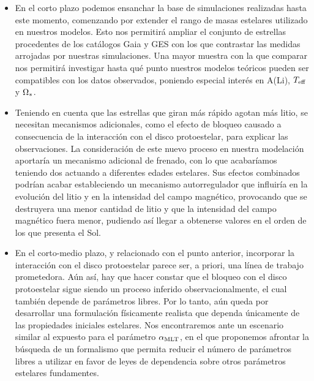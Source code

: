 \begin{itemize}
    \item En el corto plazo podemos ensanchar la base de simulaciones realizadas hasta este momento, comenzando por extender el rango de masas estelares utilizado en nuestros modelos. Esto nos permitirá ampliar el conjunto de estrellas procedentes de los catálogos Gaia y GES con los que contrastar las medidas arrojadas por nuestras simulaciones. Una mayor muestra con la que comparar nos permitirá investigar hasta qué punto nuestros modelos teóricos pueden ser compatibles con los datos observados, poniendo especial interés en A(Li), $T_{\mathrm{eff}}$ y $\Omega_*$.
    \item Teniendo en cuenta que las estrellas que giran más rápido agotan más litio, se necesitan mecanismos adicionales, como el efecto de bloqueo causado a consecuencia de la interacción con el disco protoestelar, para explicar las observaciones. La consideración de este nuevo proceso en nuestra modelación aportaría un mecanismo adicional de frenado, con lo que acabaríamos teniendo dos actuando a diferentes edades estelares. Sus efectos combinados podrían acabar estableciendo un mecanismo autorregulador que influiría en la evolución del litio y en la intensidad del campo magnético, provocando que se destruyera una menor cantidad de litio y que la intensidad del campo magnético fuera menor, pudiendo así llegar a obtenerse valores en el orden de los que presenta el Sol.
    \item En el corto-medio plazo, y relacionado con el punto anterior, incorporar la interacción con el disco protoestelar parece ser, a priori, una línea de trabajo prometedora. Aún así, hay que hacer constar que el bloqueo con el disco protoestelar sigue siendo un proceso inferido observacionalmente, el cual también depende de parámetros libres. Por lo tanto, aún queda por desarrollar una formulación físicamente realista que dependa únicamente de las propiedades iniciales estelares. Nos encontraremos ante un escenario similar al expuesto para el parámetro $\alpha_{\mathrm{MLT}}$, en el que proponemos afrontar la búsqueda de un formalismo que permita reducir el número de parámetros libres a utilizar en favor de leyes de dependencia sobre otros parámetros estelares fundamentes.

\end{itemize}
